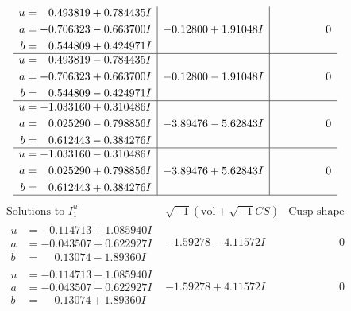 \documentclass[1p]{elsarticle_modified}
\theoremstyle{definition}
\newcommand{\I}{\sqrt{-1}}
\begin{document}
$$\begin{array}{c|c|c}
\begin{aligned}
u &= \phantom{-}0.493819 + 0.784435 I \\
a &= -0.706323 - 0.663700 I \\
b &= \phantom{-}0.544809 + 0.424971 I\end{aligned}
 & -0.12800 + 1.91048 I & \phantom{-0.000000 } 0 \\ \hline\begin{aligned}
u &= \phantom{-}0.493819 - 0.784435 I \\
a &= -0.706323 + 0.663700 I \\
b &= \phantom{-}0.544809 - 0.424971 I\end{aligned}
 & -0.12800 - 1.91048 I & \phantom{-0.000000 } 0 \\ \hline\begin{aligned}
u &= -1.033160 + 0.310486 I \\
a &= \phantom{-}0.025290 - 0.798856 I \\
b &= \phantom{-}0.612443 - 0.384276 I\end{aligned}
 & -3.89476 - 5.62843 I & \phantom{-0.000000 } 0 \\ \hline\begin{aligned}
u &= -1.033160 - 0.310486 I \\
a &= \phantom{-}0.025290 + 0.798856 I \\
b &= \phantom{-}0.612443 + 0.384276 I\end{aligned}
 & -3.89476 + 5.62843 I & \phantom{-0.000000 } 0\\
 \hline 
 \end{array}$$\newpage$$\begin{array}{c|c|c}  
\text{Solutions to }I^u_{1}& \I (\text{vol} + \sqrt{-1}CS) & \text{Cusp shape}\\
 \hline 
\begin{aligned}
u &= -0.114713 + 1.085940 I \\
a &= -0.043507 + 0.622927 I \\
b &= \phantom{-}0.13074 - 1.89360 I\end{aligned}
 & -1.59278 - 4.11572 I & \phantom{-0.000000 } 0 \\ \hline\begin{aligned}
u &= -0.114713 - 1.085940 I \\
a &= -0.043507 - 0.622927 I \\
b &= \phantom{-}0.13074 + 1.89360 I\end{aligned}
 & -1.59278 + 4.11572 I & \phantom{-0.000000 } 0 \\ \hline\begin{aligned}

\end{aligned}
\end{array}$$
\end{document}
